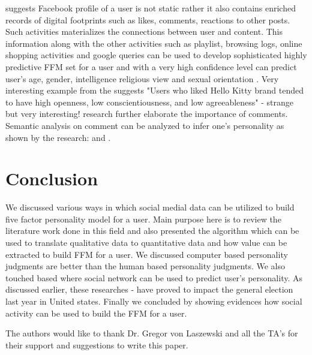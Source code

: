 \documentclass[sigconf]{acmart}
\begin{document}
\cite{ref13} suggests Facebook profile of a user is not static rather it also contains enriched records of digital footprints such as likes, comments, reactions to other posts. Such activities materializes the connections between user and content. This information along with the other activities such as playlist, browsing logs, online shopping activities and google queries can be used to develop sophisticated highly predictive FFM set for a user and with a very high confidence level can predict user’s age, gender, intelligence religious view and sexual orientation \cite{ref13}. Very interesting example from the \cite{ref13} suggests "Users who liked Hello Kitty brand tended to have high openness, low conscientiousness, and low agreeableness" - strange but very interesting! \cite{ref13} research further elaborate the importance of comments. Semantic analysis on comment can be analyzed to infer one's personality as shown by the research: \cite{ref16} and \cite{ref17}. 
 
\section{Conclusion}

We discussed various ways in which social medial data can be utilized to build five factor personality model for a user. Main purpose here is to review the literature work done in this field and also presented the algorithm which can be used to translate qualitative data to quantitative data and how value can be extracted to build FFM for a user. We discussed computer based personality judgments are better than the human based personality judgments. We also touched based where social network can be used to predict user’s personality.  As discussed earlier, these researches \cite{ref2} - \cite{ref7}  have proved to impact the general election last year in United states. Finally we concluded by showing evidences how social activity can be used to build the FFM for a user. 


\begin{acks}

  The authors would like to thank Dr. Gregor von Laszewski and all the TA's for their
  support and suggestions to write this paper. 

\end{acks}


 
\end{document}

